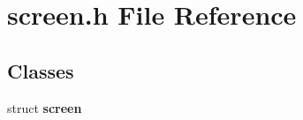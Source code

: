 \section{screen.h File Reference}
\label{screen_8h}
\subsection*{Classes}
\begin{CompactItemize}
\item 
struct {\bf screen}
\end{CompactItemize}
